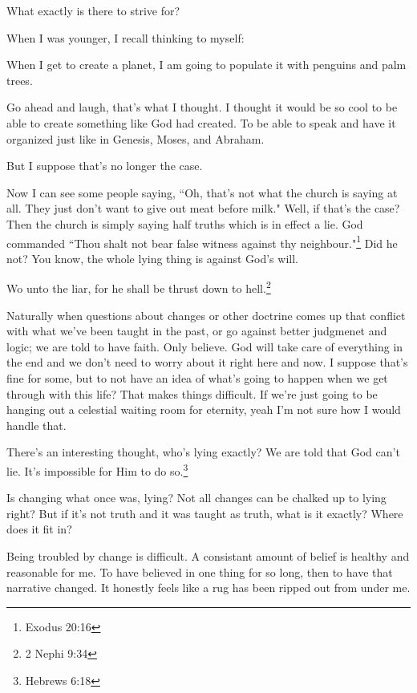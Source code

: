 \documentclass{article}
\begin{document}
What exactly is there to strive for?

When I was younger, I recall thinking to myself: 

\begin{displayquote}
When I get to create a planet, I am going to populate it with 
penguins and palm trees. 
\end{displayquote}

Go ahead and laugh, that's what I thought. I thought it would be so cool to be 
able to create something like God had created. To be able to speak and have it 
organized just like in Genesis, Moses, and Abraham.

But I suppose that's no longer the case.

Now I can see some people saying, ``Oh, that's not what the church is saying
at all. They just don't want to give out meat before milk." Well, if that's
the case? Then the church is simply saying half truths which is in effect a
lie. God commanded ``Thou shalt not bear false witness against thy 
neighbour."\footnote{Exodus 20:16} Did he not? You know, the whole lying thing
is against God's will.

\begin{displayquote}
Wo unto the liar, for he shall be thrust down to hell.\footnote{2 Nephi 9:34}
\end{displayquote}

Naturally when questions about changes or other doctrine comes up that conflict
with what we've been taught in the past, or go against better judgmenet and
logic; we are told to have faith. Only believe. God will take care of everything
in the end and we don't need to worry about it right here and now. I suppose
that's fine for some, but to not have an idea of what's going to happen when
we get through with this life? That makes things difficult. If we're just 
going to be hanging out a celestial waiting room for eternity, yeah I'm not
sure how I would handle that.

There's an interesting thought, who's lying exactly? We are told that God can't
lie. It's impossible for Him to do so.\footnote{Hebrews 6:18}

Is changing what once was, lying? Not all changes can be chalked up to lying
right? But if it's not truth and it was taught as truth, what is it exactly?
Where does it fit in?

Being troubled by change is difficult. A consistant amount of belief is healthy
and reasonable for me. To have believed in one thing for so long, then to have
that narrative changed. It honestly feels like a rug has been ripped out from
under me.
\end{document}
